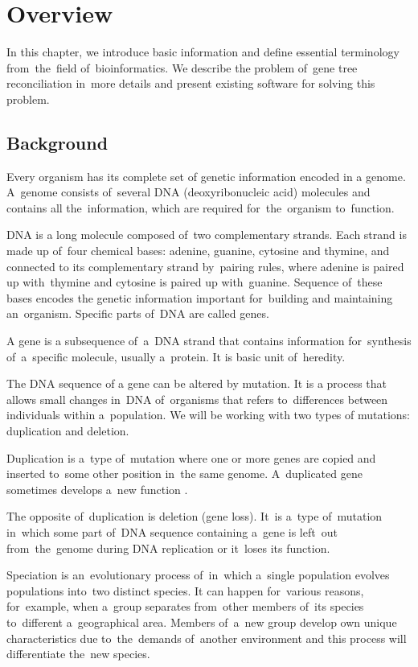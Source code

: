 \chapter{Overview}
In this chapter, we introduce basic information and define essential terminology from~the~field of~bioinformatics. We describe the problem of~gene tree reconciliation in~more details and present existing software for solving this problem.

\section{Background}
Every organism has its complete set of genetic information encoded in a genome. A~genome consists of~several DNA (deoxyribonucleic acid) molecules and contains all the~information, which are required for~the~organism to~function.

DNA is a long molecule composed of~two complementary strands. Each strand is made up of~four chemical bases: adenine, guanine, cytosine and thymine, and connected to its complementary strand by~pairing rules, where adenine is paired up with~thymine and cytosine is paired up with~guanine. Sequence of~these bases encodes the genetic information important for~building and maintaining an~organism. Specific parts of~DNA are called genes.

A gene is a subsequence of~a~DNA strand that contains information for~synthesis of~a~specific molecule, usually a~protein. It is basic unit of~heredity.

The DNA sequence of a gene can be altered by mutation. It is a process that allows small changes in~DNA of~organisms that refers to~differences between individuals within a~population. We will be working with two types of mutations: duplication and deletion.

Duplication is a~type of~mutation where one or more genes are copied and inserted to~some other position in~the same genome. A~duplicated gene sometimes develops a~new function \cite{doyon}. 

The opposite of~duplication is deletion (gene loss). It~is a~type of~mutation in~which some part of~DNA sequence containing a~gene is left~out from~the~genome during DNA replication or it~loses its function. 

Speciation is an~evolutionary process of~in~which a~single population evolves populations into~two distinct species. It can happen for~various reasons, for~example, when a~group separates from~other members of~its species to~different a~geographical area. Members of~a~new group develop own unique characteristics due to~the~demands of~another environment and this process will differentiate the~new species.

